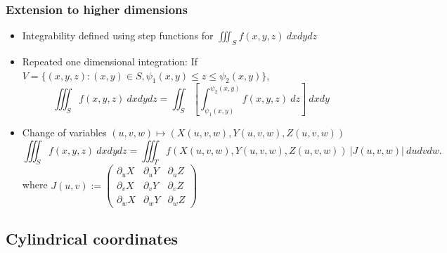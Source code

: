 \documentclass[aspectratio=169,handout]{beamer}
\newcommand{\abs}[1]{\left|#1\right|} %
\begin{document}









\begin{frame}
    \frametitle{Extension to higher dimensions}



    \begin{itemize}
        \item Integrability defined using step functions for \(\iiint_{S} f(x,y,z) \ dxdydz\)
        \item Repeated one dimensional integration: If \(V = \{(x,y,z) : (x,y) \in S, \psi_1(x,y) \leq z \leq \psi_2(x,y)\}\),
        \[
            \iiint_{S} f(x,y,z) \ dxdydz = \iint_{S} \left[\int_{\psi_1(x,y)}^{\psi_2(x,y)} f(x,y,z)\ dz\right] \ dxdy
        \]
        \item Change of variables \((u,v,w) \mapsto (X(u,v,w),Y(u,v,w),Z(u,v,w))\) 
        \[
            \iiint_{S} f(x,y,z) \ dxdydz = \iiint_{T} f(X(u,v,w),Y(u,v,w),Z(u,v,w)) \ \abs{J(u,v,w)} \ dudvdw.
        \]
        where 
        \(J(u,v):= \begin{pmatrix}
            \partial_u X & \partial_u Y & \partial_u Z \\ \partial_v X & \partial_v Y & \partial_v Z \\ \partial_w X & \partial_w Y & \partial_w Z
        \end{pmatrix}\)
    \end{itemize}

\end{frame}

\subsection{Cylindrical coordinates}
\end{document}
